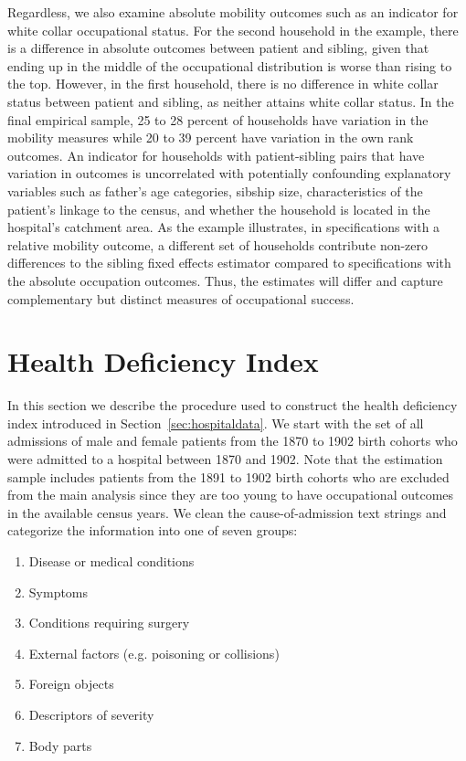 \documentclass[12pt,english]{article}
\begin{document}
Regardless, we also examine absolute mobility outcomes such as an indicator for white collar occupational status. For the second household in the example, there is a difference in absolute outcomes between patient and sibling, given that ending up in the middle of the occupational distribution is worse than rising to the top. However, in the first household, there is no difference in white collar status between patient and sibling, as neither attains white collar status. In the final empirical sample, 25 to 28 percent of households have variation in the mobility measures while 20 to 39 percent have variation in the own rank outcomes. An indicator for households with patient-sibling pairs that have variation in outcomes is uncorrelated with potentially confounding explanatory variables such as father's age categories, sibship size, characteristics of the patient's linkage to the census, and whether the household is located in the hospital's catchment area. As the example illustrates, in specifications with a relative mobility outcome, a different set of households contribute non-zero differences to the sibling fixed effects estimator compared to specifications with the absolute occupation outcomes. Thus, the estimates will differ and capture complementary but distinct measures of occupational success.

\section{Health Deficiency Index\label{sec:health-deficiency-index}}
In this section we describe the procedure used to construct the health deficiency index introduced in Section~\ref{sec:hospitaldata}. We start with the set of all admissions of male and female patients from the 1870 to 1902 birth cohorts who were admitted to a hospital between 1870 and 1902. Note that the estimation sample includes patients from the 1891 to 1902 birth cohorts who are excluded from the main analysis since they are too young to have occupational outcomes in the available census years. We clean the cause-of-admission text strings and categorize the information into one of seven groups:

\begin{enumerate}
	\singlespacing
	\item Disease or medical conditions
	\item Symptoms
	\item Conditions requiring surgery
	\item External factors (e.g. poisoning or collisions)
	\item Foreign objects
	\item Descriptors of severity
	\item Body parts
\end{enumerate}
\end{document}
